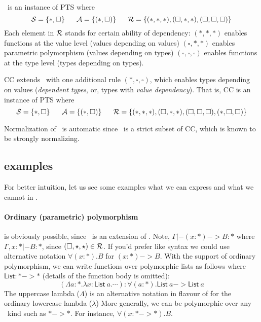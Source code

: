 \Fw\ is an instance of PTS where
\[\mathcal{S}=\{*,\square\}
  ~~~~~
  \mathcal{A}=\{(*,\square)\}
  ~~~~~
  \mathcal{R}=\{(*,*,*),(\square,*,*),(\square,\square,\square)\}
\]
Each element in $\mathcal{R}$ stands for certain ability of dependency:
$(*,*,*)$ enables functions at the value level
(values depending on values)
$(\square,*,*)$ enables parametric polymorphism
(values depending on types)
$(\square,\square,\square)$ enables functions at the type level
(types depending on types).

CC extends \Fw\ with one additional rule
$(*,\square,\square)$, which enables types depending on values
(\emph{dependent types}, or, types with \emph{value dependency}).
That is, CC is an instance of PTS where
\[\mathcal{S}=\{*,\square\}
  ~~~~~
  \mathcal{A}=\{(*,\square)\}
  ~~~~~
  \mathcal{R}=\{(*,*,*),(\square,*,*),(\square,\square,\square)
         ,(*,\square,\square)\}\]


Normalization of \Fi\ is automatic since \Fi\ is a strict subset of CC,
which is known to be strongly normalizing.

\subsection{examples}
For better intuition, let us see some examples what we can express and
what we cannot in \Fi.
\newcommand{\List}{\mathsf{List}}
\newcommand{\Vect}{\mathsf{Vec}}

\paragraph{Ordinary (parametric) polymorphism} is obviously possible,
since \Fi\ is an extension of \Fw. Note, $\Gamma |- (x:*) -> B : *$
where $\Gamma,x:* |- B:*$, since $(\square,\star,\star) \in\mathcal{R}$.
If you'd prefer \Fw\-like syntax we could use alternative notation
$\forall(x:*).B$ for $(x:*) -> B$. With the support of ordinary polymorphism,
we can write functions over polymorphic lists as follows
where $\List : * -> *$ (details of the function body is omitted):
\[ (\Lambda a:*.\lambda x:\List~a. \cdots) : \forall(a:*).\List~a -> \List~a \]
The uppercase lambda ($\Lambda$) is an alternative notation in flavour of \Fw
for the ordinary lowercase lambda ($\lambda$)
More generally, we can be polymorphic over any \Fw\ kind such as $* -> *$.
For instance, $\forall(x:* -> *).B$.

